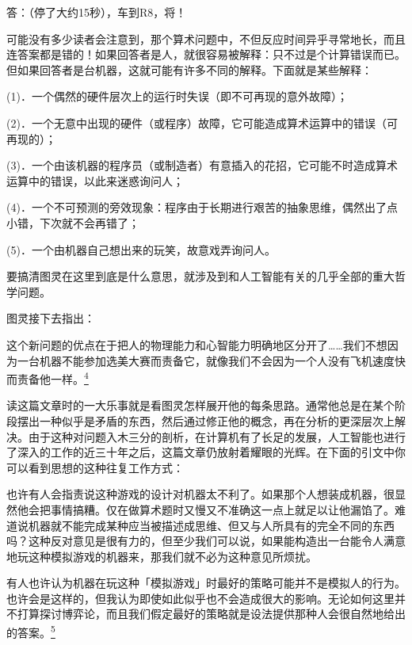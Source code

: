 \documentclass[
  12pt,
  twoside,
  openright,
  oldfontcommands,
]{memoir}
\newenvironment{fsquote}{%
  \begin{mdframed}[style=gebquote]\kaitifamily\small%
}{%
  \end{mdframed}%
}
\begin{document}
\begin{fsquote}
答：（停了大约15秒），车到R8，将！
\end{fsquote}

可能没有多少读者会注意到，那个算术问题中，不但反应时间异乎寻常地长，而且连答案都是错的！如果回答者是人，就很容易被解释：只不过是个计算错误而已。但如果回答者是台机器，这就可能有许多不同的解释。下面就是某些解释：

(1)．一个偶然的硬件层次上的运行时失误（即不可再现的意外故障）；

(2)．一个无意中出现的硬件（或程序）故障，它可能造成算术运算中的错误（可再现的）；

(3)．一个由该机器的程序员（或制造者）有意插入的花招，它可能不时造成算术运算中的错误，以此来迷惑询问人；

(4)．一个不可预测的旁效现象：程序由于长期进行艰苦的抽象思维，偶然出了点小错，下次就不会再错了；

(5)．一个由机器自己想出来的玩笑，故意戏弄询问人。

要搞清图灵在这里到底是什么意思，就涉及到和人工智能有关的几乎全部的重大哲学问题。

图灵接下去指出：

\begin{fsquote}
这个新问题的优点在于把人的物理能力和心智能力明确地区分开了\ldots\ldots 我们不想因为一台机器不能参加选美大赛而责备它，就像我们不会因为一个人没有飞机速度快而责备他一样。\hyperref[fn:Chapter18-4]{\textsuperscript{4}}
\end{fsquote}

读这篇文章时的一大乐事就是看图灵怎样展开他的每条思路。通常他总是在某个阶段摆出一种似乎是矛盾的东西，然后通过修正他的概念，再在分析的更深层次上解决。由于这种对问题入木三分的剖析，在计算机有了长足的发展，人工智能也进行了深入的工作的近三十年之后，这篇文章仍放射着耀眼的光辉。在下面的引文中你可以看到思想的这种往复工作方式：

\begin{fsquote}
也许有人会指责说这种游戏的设计对机器太不利了。如果那个人想装成机器，很显然他会把事情搞糟。仅在做算术题时又慢又不准确这一点上就足以让他漏馅了。难道说机器就不能完成某种应当被描述成思维、但又与人所具有的完全不同的东西吗？这种反对意见是很有力的，但至少我们可以说，如果能构造出一台能令人满意地玩这种模拟游戏的机器来，那我们就不必为这种意见所烦扰。
\end{fsquote}

有人也许认为机器在玩这种「模拟游戏」时最好的策略可能并不是模拟人的行为。也许会是这样的，但我认为即使如此似乎也不会造成很大的影响。无论如何这里并不打算探讨博弈论，而且我们假定最好的策略就是设法提供那种人会很自然地给出的答案。\hyperref[fn:Chapter18-5]{\textsuperscript{5}}
\end{document}
